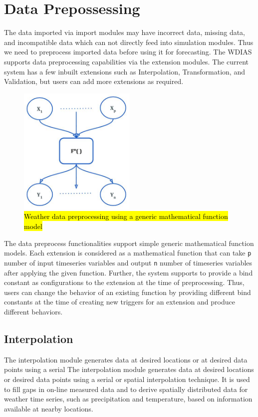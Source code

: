 \section{Data Prepossessing}
\label{se:data_preprocess}

The data imported via import modules may have incorrect data, missing data, and incompatible data which can not directly feed into simulation modules.
Thus we need to preprocess imported data before using it for forecasting. The WDIAS supports data preprocessing capabilities via the extension modules. The current system has a few inbuilt extensions such as Interpolation, Transformation, and Validation, but users can add more extensions as required.

\begin{figure}[htp]
    \centering
    \includegraphics[width=0.5\textwidth]{method/data_preprocess/weather_data_preprocessing.jpg}
    \caption{\hl{Weather data preprocessing using a generic mathematical function model}}
    \label{fi:weather_data_preprocessing}
\end{figure}

The data preprocess functionalities support simple generic mathematical function models. Each extension is considered as a mathematical function that can take \texttt{p} number of input timeseries variables and output \texttt{n} number of timeseries variables after applying the given function. Further, the system supports to provide a bind constant as configurations to the extension at the time of preprocessing. Thus, users can change the behavior of an existing function by providing different bind constants at the time of creating new triggers for an extension and produce different behaviors.

\subsection{Interpolation}
The interpolation module generates data at desired locations or at desired data points using a serial The interpolation module generates data at desired locations or desired data points using a serial or spatial interpolation technique. It is used to fill gaps in on-line measured data and to derive spatially distributed data for weather time series, such as precipitation and temperature, based on information available at nearby locations.

